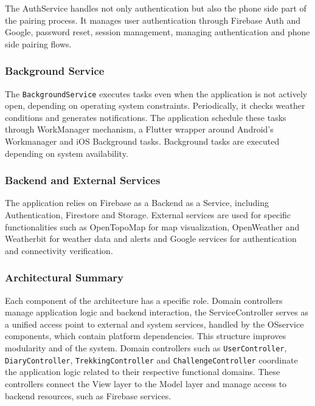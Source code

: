The AuthService handles not only authentication but also the phone side part of the pairing process.
It manages user authentication through Firebase Auth and Google, password reset, session management, managing authentication and phone side pairing flows.

\subsubsection{Background Service}
The \texttt{BackgroundService} executes tasks even when the application is not actively open, depending on operating system constraints.
Periodically, it checks weather conditions and generates notifications. The  application schedule these tasks through WorkManager mechanism, a Flutter wrapper around Android's Workmanager and iOS Background tasks. Background tasks are executed depending on system availability.
\subsubsection{Backend and External Services}

The application relies on Firebase as a Backend as a Service, including Authentication, Firestore and Storage.
External services are used for specific functionalities such as OpenTopoMap for map visualization, OpenWeather and Weatherbit for weather data and alerts and Google services for authentication and connectivity verification.

\subsubsection{Architectural Summary}

Each component of the architecture has a specific role. Domain controllers manage application logic and backend interaction, the ServiceController serves as a unified access point to external and system services, handled by the OSservice components, which contain platform dependencies. This structure improves modularity and of the system.
Domain controllers such as \texttt{UserController}, \texttt{DiaryController}, \texttt{TrekkingController} and \texttt{ChallengeController}  coordinate the application logic related to their respective functional domains. These controllers connect the View layer to the Model layer and manage access to backend resources, such as Firebase services.










